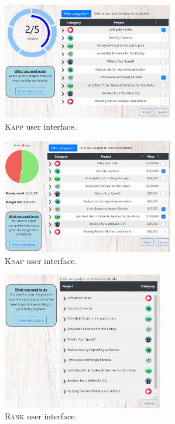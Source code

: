 \documentclass[letterpaper]{article} %
\newcommand{\rank}{\textsc{Rank}}
\newcommand{\knap}{\textsc{Knap}}
\newcommand{\kapp}{\textsc{Kapp}}
\begin{document}
\begin{figure}[ht!]
     \centering
          \begin{subfigure}[b]{0.45\textwidth}
         \centering
       \includegraphics[width=7.5cm]{experiment/k approval.PNG}
\caption{\kapp{} user interface.
}\label{fig:kapp_inter}
     \end{subfigure}\hfill
     \begin{subfigure}[b]{0.45\textwidth}
         \centering
         \includegraphics[width=7.5cm]{experiment/knapsack.PNG}
\caption{\knap{}  user interface.
}\label{fig:knap_welfare_app}
     \end{subfigure}
     \hfill
     \begin{subfigure}[b]{0.45\textwidth}
         \centering
         \includegraphics[width=7cm]{experiment/ranking.PNG}
\caption{\rank{} user interface.
}\label{fig:rank_inter}
     \end{subfigure}
     \hfill
     \begin{subfigure}[b]{0.45\textwidth}

\end{subfigure}
\end{figure}
\end{document}
